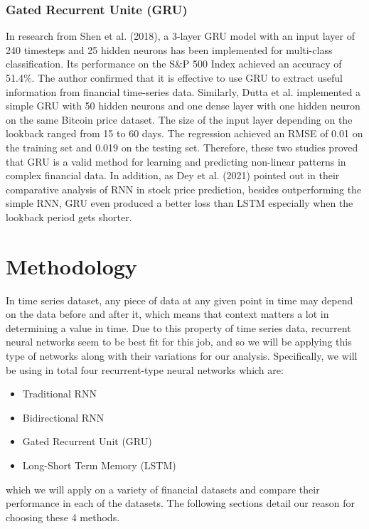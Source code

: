 \documentclass[letterpaper, 10 pt, conference]{ieeeconf}  %
\begin{document}
    \subsubsection{Gated Recurrent Unite (GRU)}
        In research from Shen et al. (2018), a 3-layer GRU model with an input layer of 240 timesteps and 25 hidden neurons has been implemented for multi-class classification. Its performance on the S\&P 500 Index achieved an accuracy of 51.4\%. The author confirmed that it is effective to use GRU to extract useful information from financial time-series data. Similarly, Dutta et al. implemented a simple GRU with 50 hidden neurons and one dense layer with one hidden neuron on the same Bitcoin price dataset. The size of the input layer depending on the lookback ranged from 15 to 60 days. The regression achieved an RMSE of 0.01 on the training set and 0.019 on the testing set. Therefore, these two studies proved that GRU is a valid method for learning and predicting non-linear patterns in complex financial data. In addition, as Dey et al. (2021) pointed out in their comparative analysis of RNN in stock price prediction, besides outperforming the simple RNN, GRU even produced a better loss than LSTM especially when the lookback period gets shorter.

\section{Methodology}
    In time series dataset, any piece of data at any given point in time may depend on the data before and after it, which means that context matters a lot in determining a value in time. Due to this property of time series data, recurrent neural networks seem to be best fit for this job, and so we will be applying this type of networks along with their variations for our analysis. Specifically, we will be using in total four recurrent-type neural networks which are: 
    \begin{itemize}
        \item Traditional RNN
        \item Bidirectional RNN
        \item Gated Recurrent Unit (GRU)
        \item Long-Short Term Memory (LSTM)
    \end{itemize}
    which we will apply on a variety of financial datasets and compare their performance in each of the datasets. The following sections detail our reason for choosing these 4 methods.
    
\end{document}
